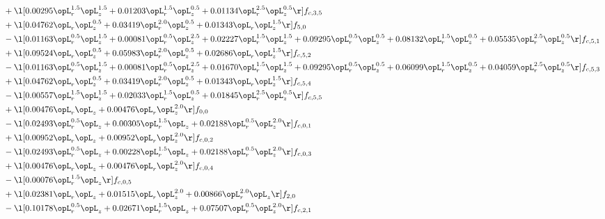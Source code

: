 \begin{alignat}{2}
& + \l[  0.00295 \opL_r^{1.5} \opL_z^{1.5} +  0.01203 \opL_r^{1.5} \opL_z^{0.5} +  0.01134 \opL_r^{2.5} \opL_z^{0.5}  \r] f_{c,3,5} \nonumber \\ 
& + \l[  0.04762 \opL_r \opL_z^{0.5} +  0.03419 \opL_r^{2.0} \opL_z^{0.5} +  0.01343 \opL_r \opL_z^{1.5}  \r] f_{5,0} \nonumber \\ 
& - \l[  0.01163 \opL_r^{0.5} \opL_z^{1.5} +  0.00081 \opL_r^{0.5} \opL_z^{2.5} +  0.02227 \opL_r^{1.5} \opL_z^{1.5} +  0.09295 \opL_r^{0.5} \opL_z^{0.5} +  0.08132 \opL_r^{1.5} \opL_z^{0.5} +  0.05535 \opL_r^{2.5} \opL_z^{0.5}  \r] f_{c,5,1} \nonumber \\ 
& + \l[  0.09524 \opL_r \opL_z^{0.5} +  0.05983 \opL_r^{2.0} \opL_z^{0.5} +  0.02686 \opL_r \opL_z^{1.5}  \r] f_{c,5,2} \nonumber \\ 
& - \l[  0.01163 \opL_r^{0.5} \opL_z^{1.5} +  0.00081 \opL_r^{0.5} \opL_z^{2.5} +  0.01670 \opL_r^{1.5} \opL_z^{1.5} +  0.09295 \opL_r^{0.5} \opL_z^{0.5} +  0.06099 \opL_r^{1.5} \opL_z^{0.5} +  0.04059 \opL_r^{2.5} \opL_z^{0.5}  \r] f_{c,5,3} \nonumber \\ 
& + \l[  0.04762 \opL_r \opL_z^{0.5} +  0.03419 \opL_r^{2.0} \opL_z^{0.5} +  0.01343 \opL_r \opL_z^{1.5}  \r] f_{c,5,4} \nonumber \\ 
& - \l[  0.00557 \opL_r^{1.5} \opL_z^{1.5} +  0.02033 \opL_r^{1.5} \opL_z^{0.5} +  0.01845 \opL_r^{2.5} \opL_z^{0.5}  \r] f_{c,5,5} \nonumber \\ 
& + \l[  0.00476 \opL_r \opL_z +  0.00476 \opL_r \opL_z^{2.0}  \r] f_{0,0} \nonumber \\ 
& - \l[  0.02493 \opL_r^{0.5} \opL_z +  0.00305 \opL_r^{1.5} \opL_z +  0.02188 \opL_r^{0.5} \opL_z^{2.0}  \r] f_{c,0,1} \nonumber \\ 
& + \l[  0.00952 \opL_r \opL_z +  0.00952 \opL_r \opL_z^{2.0}  \r] f_{c,0,2} \nonumber \\ 
& - \l[  0.02493 \opL_r^{0.5} \opL_z +  0.00228 \opL_r^{1.5} \opL_z +  0.02188 \opL_r^{0.5} \opL_z^{2.0}  \r] f_{c,0,3} \nonumber \\ 
& + \l[  0.00476 \opL_r \opL_z +  0.00476 \opL_r \opL_z^{2.0}  \r] f_{c,0,4} \nonumber \\ 
& - \l[  0.00076 \opL_r^{1.5} \opL_z  \r] f_{c,0,5} \nonumber \\ 
& + \l[  0.02381 \opL_r \opL_z +  0.01515 \opL_r \opL_z^{2.0} +  0.00866 \opL_r^{2.0} \opL_z  \r] f_{2,0} \nonumber \\ 
& - \l[  0.10178 \opL_r^{0.5} \opL_z +  0.02671 \opL_r^{1.5} \opL_z +  0.07507 \opL_r^{0.5} \opL_z^{2.0}  \r] f_{c,2,1} \nonumber \\ 

\end{alignat}
